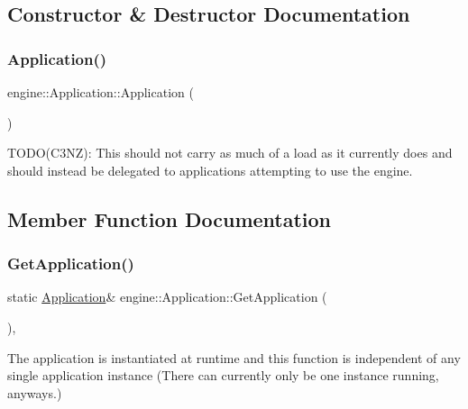 \subsection{Constructor \& Destructor Documentation}
\mbox{\label{classengine_1_1Application_a9740cd2e55318cbc5684a6c4c2f3304f}} 
\subsubsection{\texorpdfstring{Application()}{Application()}}
{\footnotesize\ttfamily engine\+::\+Application\+::\+Application (\begin{DoxyParamCaption}{ }\end{DoxyParamCaption})}

T\+O\+D\+O(\+C3\+N\+Z)\+: This should not carry as much of a load as it currently does and should instead be delegated to applications attempting to use the engine. 

\subsection{Member Function Documentation}
\mbox{\label{classengine_1_1Application_a639cdab87d3c5a14d0a9e9203d6c7c97}} 
\subsubsection{\texorpdfstring{Get\+Application()}{GetApplication()}}
{\footnotesize\ttfamily static \hyperlink{classengine_1_1Application}{Application}\& engine\+::\+Application\+::\+Get\+Application (\begin{DoxyParamCaption}{ }\end{DoxyParamCaption})\hspace{0.3cm}{\ttfamily [inline]}, {\ttfamily [static]}}

The application is instantiated at runtime and this function is independent of any single application instance (There can currently only be one instance running, anyways.) \mbox{\label{classengine_1_1Application_a0c66a3ff294bcc497bb2e8eb7330124c}} 
